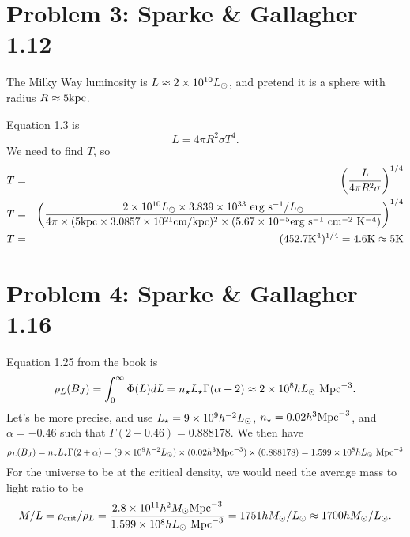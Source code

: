 \documentclass[]{article}
\begin{document}
\section{Problem 3: Sparke \& Gallagher 1.12}

The Milky Way luminosity is $L\approx2\times10^{10}L_{\odot}$,
and pretend it is a sphere with radius $R\approx5\mathrm{kpc}$.

Equation 1.3 is
\begin{equation}
L=4\pi R^2 \sigma T^4.
\end{equation}
\noindent
We need to find $T$, so
\begin{eqnarray}
T &=& \left( \frac{L}{4\pi R^2 \sigma}\right)^{1/4}\\
T &=& \left( \frac{2\times10^{10}L_{\odot} \times 3.839\times10^{33}~\mathrm{erg}~\mathrm{s}^{-1}/L_{\odot}}{4\pi\times(5\mathrm{kpc} \times 3.0857\times10^{21}\mathrm{cm}/\mathrm{kpc})^2 \times (5.67\times10^{-5}\mathrm{erg}~\mathrm{s}^{-1}~\mathrm{cm}^{-2}~\mathrm{K}^{-4})}\right)^{1/4}\\
T &=& (452.7\mathrm{K}^{4})^{1/4} = 4.6\mathrm{K} \approx 5\mathrm{K}
\end{eqnarray}

\section{Problem 4: Sparke \& Gallagher 1.16}

Equation 1.25 from the book is
\begin{equation}
\rho_{L}(B_J) = \int_{0}^{\infty}\Phi(L)dL = n_{\star}L_{\star}\Gamma(\alpha+2) \approx 2 \times 10^{8}hL_{\odot}~\mathrm{Mpc}^{-3}.
\end{equation}
\noindent
Let's be more precise, and use $L_\star = 9\times10^{9}h^{-2}L_{\odot}$, $n_{\star} = 0.02 h^{3}\mathrm{Mpc}^{-3}$, and $\alpha=-0.46$ such that $\Gamma(2-0.46) = 0.888178$.  We then have
\begin{equation}
\rho_L (B_J) = n_{\star}L_\star\Gamma(2+\alpha) = (9\times10^{9}h^{-2}L_{\odot}) \times (0.02 h^{3}\mathrm{Mpc}^{-3}) \times (0.888178) = 1.599\times10^{8}hL_{\odot}~\mathrm{Mpc}^{-3}
\end{equation}
\noindent
For the universe to be at the critical density, we would need
the average mass to light ratio to be
\begin{equation}
M/L = \rho_{\mathrm{crit}}/\rho_L = \frac{2.8\times10^{11}h^{2}M_{\odot}\mathrm{Mpc}^{-3}}{1.599\times10^{8}hL_{\odot}~\mathrm{Mpc}^{-3}} = 1751 hM_{\odot}/L_{\odot} \approx 1700 hM_{\odot}/L_{\odot}.
\end{equation}
\end{document}
